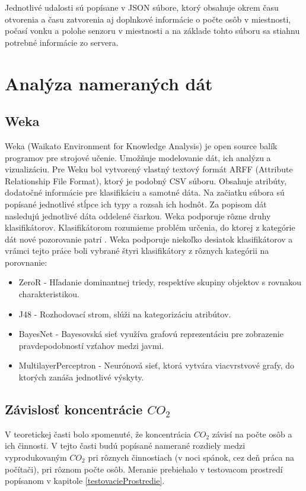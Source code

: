 Jednotlivé udalosti sú popísane v JSON súbore, ktorý obsahuje okrem času otvorenia a času zatvorenia aj doplnkové informácie o počte osôb v miestnosti, počasí vonku a polohe senzoru v miestnosti a na základe tohto súboru sa stiahnu potrebné informácie zo servera.

\chapter{Analýza nameraných dát}

\section{Weka}
Weka (Waikato Environment for Knowledge Analysis) je open source balík programov pre strojové učenie. Umožňuje modelovanie dát, ich analýzu a vizualizáciu. Pre Weku bol vytvorený vlastný textový formát ARFF (Attribute Relationship File Format), ktorý je podobný CSV súboru. Obsahuje atribúty, dodatočné informácie pre klasifikáciu a samotné dáta. Na začiatku súbora sú popísané jednotlivé stĺpce ich typy a rozsah ich hodnôt. Za popisom dát nasledujú jednotlivé dáta oddelené čiarkou. Weka podporuje rôzne druhy klasifikátorov. Klasifikátorom rozumieme problém určenia, do ktorej z kategórie dát nové pozorovanie patrí \cite{klasifikacia}. Weka podporuje niekoľko desiatok klasifikátorov a vrámci tejto práce boli vybrané štyri klasifikátory z rôznych kategórii na porovnanie\cite{wekaManual}:
\begin{itemize}
    \item ZeroR - Hľadanie dominantnej triedy, respektíve skupiny objektov s rovnakou charakteristikou.
    \item J48 - Rozhodovací strom, slúži na kategorizáciu atribútov.
    \item BayesNet - Bayesovská sieť využíva grafovú reprezentáciu pre zobrazenie pravdepodobností vzťahov medzi javmi.
    \item MultilayerPerceptron - Neurónová sieť, ktorá vytvára viacvrstvové grafy, do ktorých zanáša jednotlivé výskyty.
\end{itemize}

\section{Závislosť koncentrácie $CO_2$}\label{zavislostKoncentracie}
V teoretickej časti bolo spomenuté, že koncentrácia $CO_2$ závisí na počte osôb a ich činnosti. V tejto časti budú popísané namerané rozdiely medzi vyprodukovaným $CO_2$ pri rôznych činnostiach (v noci spánok, cez deň práca na počítači), pri rôznom počte osôb. Meranie prebiehalo v testovacom prostredí popísanom v kapitole \ref{testovacieProstredie}. 

